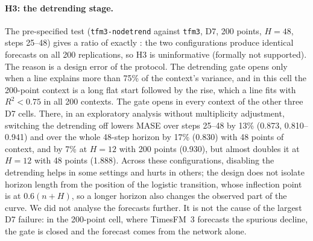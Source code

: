 \begin{table}[!htbp]
\centering
\caption{Tier C (descriptive): geometric-mean MASE relative to Seasonal Naive over 200 replications per cell, and the best of the
pre-specified classical baselines in each cell, chosen after the fact (on D8 the zero forecast is better; Table~\ref{tab:zerod8}). Last column: TimesFM~3 over the best classical model (bold: TimesFM~3
worse). TiRex-2 is not run beyond 320 steps.}
\label{tab:tierc}
\scriptsize
\setlength{\tabcolsep}{3pt}

\end{table}

\begin{table}[!htbp]
\centering
\caption{Intermittent demand (D8, descriptive, not pre-specified): geometric-mean MASE relative to Seasonal Naive (the naive forecast
here) of the zero forecast, which is the true median (demand is zero with probability 0.7), and of the foundation models and the
historic mean, on the replications with a positive error for every model.}
\label{tab:zerod8}
\scriptsize

\end{table}

\paragraph{H3: the detrending stage.} The pre-specified test (\texttt{tfm3-nodetrend} against \texttt{tfm3}, D7, 200 points,
$H = 48$, steps 25--48) gives a ratio of exactly \Hthree{}: the two configurations produce identical forecasts on all 200
replications, so H3 is uninformative (formally not supported). The reason is a design error of the protocol. The detrending gate opens only when a line
explains more than 75\% of the context's variance, and in this cell the 200-point context is a long flat start followed by the
rise, which a line fits with $R^2 < 0.75$ in all 200 contexts. The gate opens in every context of the other three D7 cells. There,
in an exploratory analysis without multiplicity adjustment, switching the detrending off lowers MASE over steps 25--48 by 13\%
(0.873, 0.810--0.941) and over the whole 48-step horizon by 17\% (0.830) with 48 points of context, and by 7\% at $H = 12$ with 200
points (0.930), but almost doubles it at $H = 12$ with 48 points (1.888). Across these configurations, disabling the detrending helps in some settings and hurts in others; the design does not isolate
horizon length from the position of the logistic transition, whose inflection point is at $0.6(n + H)$, so a longer horizon also
changes the observed part of the curve. We did not analyse the forecasts further. It is not the cause of the largest D7 failure: in the 200-point cell, where TimesFM~3 forecasts
the spurious decline, the gate is closed and the forecast comes from the network alone.

